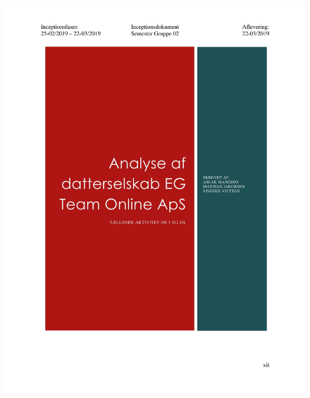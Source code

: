 \begin{figure}[hb]
  \includegraphics[scale = 0.33]{./PNG/Inceptions/Gruppe02+InceptionsDokument-45.jpg} 
\end{figure}

